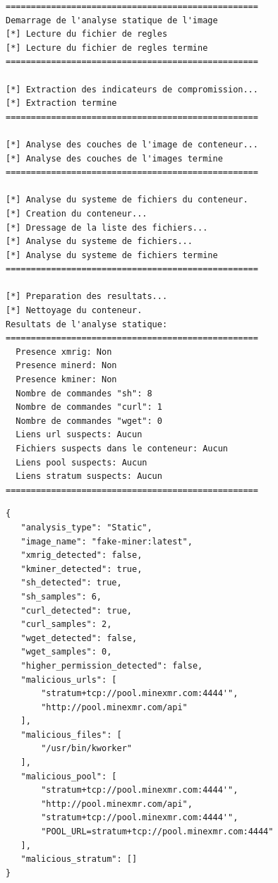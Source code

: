 \begin{lstlisting}[caption=Retour CLI nginx:latest]
==================================================
Demarrage de l'analyse statique de l'image
[*] Lecture du fichier de regles
[*] Lecture du fichier de regles termine
==================================================

[*] Extraction des indicateurs de compromission...
[*] Extraction termine
==================================================

[*] Analyse des couches de l'image de conteneur...
[*] Analyse des couches de l'images termine
==================================================

[*] Analyse du systeme de fichiers du conteneur.
[*] Creation du conteneur...
[*] Dressage de la liste des fichiers...
[*] Analyse du systeme de fichiers...
[*] Analyse du systeme de fichiers termine
==================================================

[*] Preparation des resultats...
[*] Nettoyage du conteneur.
Resultats de l'analyse statique:
==================================================
  Presence xmrig: Non
  Presence minerd: Non
  Presence kminer: Non
  Nombre de commandes "sh": 8
  Nombre de commandes "curl": 1
  Nombre de commandes "wget": 0
  Liens url suspects: Aucun
  Fichiers suspects dans le conteneur: Aucun
  Liens pool suspects: Aucun
  Liens stratum suspects: Aucun
==================================================
\end{lstlisting}

\begin{lstlisting}[caption=Retour rapport fake-miner:latest]
{
   "analysis_type": "Static",
   "image_name": "fake-miner:latest",
   "xmrig_detected": false,
   "kminer_detected": true,
   "sh_detected": true,
   "sh_samples": 6,
   "curl_detected": true,
   "curl_samples": 2,
   "wget_detected": false,
   "wget_samples": 0,
   "higher_permission_detected": false,
   "malicious_urls": [
       "stratum+tcp://pool.minexmr.com:4444'",
       "http://pool.minexmr.com/api"
   ],
   "malicious_files": [
       "/usr/bin/kworker"
   ],
   "malicious_pool": [
       "stratum+tcp://pool.minexmr.com:4444'",
       "http://pool.minexmr.com/api",
       "stratum+tcp://pool.minexmr.com:4444'",
       "POOL_URL=stratum+tcp://pool.minexmr.com:4444"
   ],
   "malicious_stratum": []
}
\end{lstlisting}


